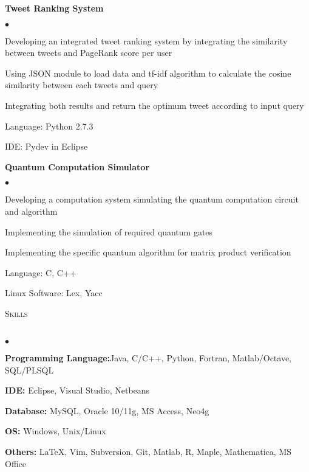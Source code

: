 \documentclass{article}
\newcommand{\lineunder}{\vspace*{-8pt} \\ \hspace*{-18pt} \hrulefill \\}
\newcommand{\header}[1]{{\hspace*{-15pt}\vspace*{6pt} \textsc{#1}} \vspace*{-6pt} \lineunder}
\newcommand{\project}[1]{\textbf{#1}}
\newenvironment{achievements}{\begin{list}{$\bullet$}{\topsep 0pt \itemsep -2pt}}{\vspace*{4pt}\end{list}}
\begin{document}
\project{Tweet Ranking System}
\begin{achievements}
	\item Developing an integrated tweet ranking system by integrating the similarity between tweets and PageRank score per user
	\item Using JSON module to load data and tf-idf algorithm to calculate the cosine similarity between each tweets and query
	\item Integrating both results and return the optimum tweet according to input query
	\item Language: Python 2.7.3
	\item IDE: Pydev in Eclipse
\end{achievements}

\project{Quantum Computation Simulator}
\begin{achievements}
	\item Developing a computation system simulating the quantum computation circuit and algorithm 
	\item Implementing the simulation of required quantum gates
	\item Implementing the specific quantum algorithm for matrix product verification
	\item Language: C, C++
	\item Linux Software: Lex, Yacc
\end{achievements}

\header{Skills}
\begin{achievements}
\item \textbf{Programming Language:}Java, C/C++, Python, Fortran, Matlab/Octave, SQL/PLSQL
\item \textbf{IDE:} Eclipse, Visual Studio, Netbeans
\item \textbf{Database:} MySQL, Oracle 10/11g, MS Access, Neo4g
\item \textbf{OS:} Windows, Unix/Linux
\item \textbf{Others:} \LaTeX, Vim, Subversion, Git, Matlab, R, Maple, Mathematica, MS Office
\end{achievements}
\end{document}
